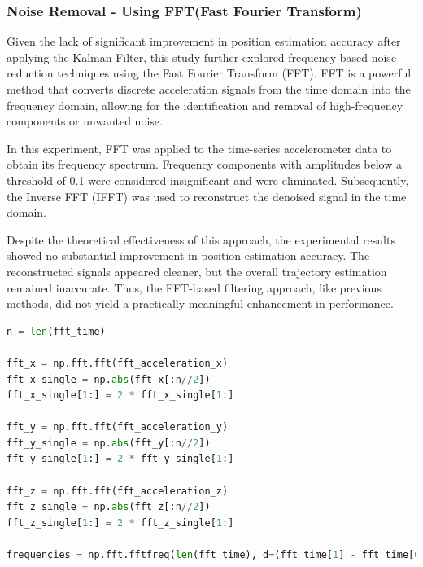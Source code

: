 \documentclass{article}
\begin{document}
\FloatBarrier
\subsubsection{Noise Removal - Using FFT(Fast Fourier Transform)}
Given the lack of significant improvement in position estimation accuracy after applying the Kalman Filter, this study further explored frequency-based noise reduction techniques using the Fast Fourier Transform (FFT). FFT is a powerful method that converts discrete acceleration signals from the time domain into the frequency domain, allowing for the identification and removal of high-frequency components or unwanted noise.

In this experiment, FFT was applied to the time-series accelerometer data to obtain its frequency spectrum. Frequency components with amplitudes below a threshold of 0.1 were considered insignificant and were eliminated. Subsequently, the Inverse FFT (IFFT) was used to reconstruct the denoised signal in the time domain.

Despite the theoretical effectiveness of this approach, the experimental results showed no substantial improvement in position estimation accuracy. The reconstructed signals appeared cleaner, but the overall trajectory estimation remained inaccurate. Thus, the FFT-based filtering approach, like previous methods, did not yield a practically meaningful enhancement in performance.
\begin{lstlisting}[language=Python, caption={Fast Fourier Transform for noise reduction}, label={lst:fft_noise_reduction}]
n = len(fft_time)

fft_x = np.fft.fft(fft_acceleration_x)
fft_x_single = np.abs(fft_x[:n//2])
fft_x_single[1:] = 2 * fft_x_single[1:]

fft_y = np.fft.fft(fft_acceleration_y)
fft_y_single = np.abs(fft_y[:n//2])
fft_y_single[1:] = 2 * fft_y_single[1:]

fft_z = np.fft.fft(fft_acceleration_z)
fft_z_single = np.abs(fft_z[:n//2])
fft_z_single[1:] = 2 * fft_z_single[1:]

frequencies = np.fft.fftfreq(len(fft_time), d=(fft_time[1] - fft_time[0]))
\end{lstlisting}
\end{document}
